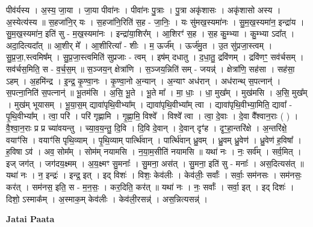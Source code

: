 \documentclass[17pt]{extarticle}
\begin{document}
पीव॑र्यस्य । अ॒स्य॒ जा॒या । जा॒या पीवा॑नः । पीवा॑नः पु॒त्राः । पु॒त्रा अकृ॑शासः । अकृ॑शासो अस्य । अ॒स्येत्य॑स्य ॥ स॒हजा॑नि॒र् यः । स॒हजा॑नि॒रिति॑ स॒ह - जा॒निः॒ । यः सु॑मख॒स्यमा॑नः । सु॒म॒ख॒स्यमा॑न॒ इन्द्रा॑य । सु॒म॒ख॒स्यमा॑न॒ इति॑ सु - म॒ख॒स्यमा॑नः । इन्द्रा॑या॒शिर᳚म् । आ॒शिरꣳ॑ स॒ह । स॒ह कु॒म्भ्या । कु॒म्भ्या ऽदा᳚त् । अदा॒दित्यदा᳚त् ॥ आ॒शीर् मे᳚ । आ॒शीरित्या᳚ - शीः । म॒ ऊर्ज᳚म् । ऊर्ज॑मु॒त । उ॒त सु॑प्रजा॒स्त्वम् । सु॒प्र॒जा॒,स्त्वमिष᳚म् । सु॒प्र॒जा॒स्त्वमिति॑ सुप्रजाः - त्वम् । इष॑म् दधातु । द॒धा॒तु॒ द्रवि॑णम् । द्रवि॑णꣳ॒॒ सव॑र्चसम् । सव॑र्चस॒मिति॒ स - व॒र्च॒स॒म् ॥ स॒ञ्जय॒न् क्षेत्रा॑णि । स॒ञ्जय॒न्निति॑ सम् - जयन्न्॑ । क्षेत्रा॑णि॒ सह॑सा । सह॑सा॒ ऽहम् । अ॒हमि॑न्द्र । इ॒न्द्र॒ कृ॒ण्वा॒नः । कृ॒ण्वा॒नो अ॒न्यान् । अ॒न्याꣳ अध॑रान् । अध॑रान्थ् स॒पत्नान्॑ । स॒पत्ना॒निति॑ स॒पत्नान्॑ ॥ भू॒तम॑सि । अ॒सि॒ भू॒ते । भू॒ते मा᳚ । मा॒ धाः॒ । धा॒ मुख᳚म् । मुख॑मसि । अ॒सि॒ मुख᳚म् । मुख॑म् भूयासम् । भू॒या॒स॒म् द्यावा॑पृथि॒वीभ्या᳚म् । द्यावा॑पृथि॒वीभ्या᳚म् त्वा । द्यावा॑पृथि॒वीभ्या॒मिति॒ द्यावा᳚ - पृ॒थि॒वीभ्या᳚म् । त्वा॒ परि॑ । परि॑ गृह्णामि । गृ॒ह्णा॒मि॒ विश्वे᳚ । विश्वे᳚ त्वा । त्वा॒ दे॒वाः । दे॒वा वै᳚श्वान॒राः ( ) । वै॒श्वा॒न॒राः प्र \newline
प्र च्या॑वयन्तु । च्या॒व॒य॒न्तु॒ दि॒वि । दि॒वि दे॒वान् । दे॒वान् दृꣳ॑ह । दृꣳ॒॒हा॒न्तरि॑क्षे । अ॒न्तरि॑क्षे॒ वयाꣳ॑सि । वयाꣳ॑सि पृथि॒व्याम् । पृ॒थि॒व्याम् पार्त्थि॑वान् । पार्त्थि॑वान् ध्रु॒वम् । ध्रु॒वम् ध्रु॒वेण॑ । ध्रु॒वेण॑ ह॒विषा᳚ । ह॒विषा ऽव॑ । अव॒ सोम᳚म् । सोम॑म् नयामसि । न॒या॒म॒सीति॑ नयामसि ॥ यथा॑ नः । नः॒ सर्व᳚म् । सर्व॒मित् । इज् जग॑त् । जग॑दय॒क्ष्मम् । अ॒य॒क्ष्मꣳ सु॒मनाः᳚ । सु॒मना॒ अस॑त् । सु॒मना॒ इति॑ सु - मनाः᳚ । अस॒दित्यस॑त् ॥ यथा॑ नः । न॒ इन्द्रः॑ । इन्द्र॒ इत् । इद् विशः॑ । विशः॒ केव॑लीः । केव॑लीः॒ सर्वाः᳚ । सर्वाः॒ सम॑नसः । सम॑नसः॒ कर॑त् । सम॑नस॒ इति॒ स - म॒न॒सः॒ । कर॒दिति॒ कर॑त् ॥ यथा॑ नः । नः॒ सर्वाः᳚ । सर्वा॒ इत् । इद् दिशः॑ । दिशो॒ ऽस्माक᳚म् । अ॒स्माक॒म् केव॑लीः । केव॑ली॒रसन्न्॑ । अस॒न्नित्यसन्न्॑ । \newline

\textbf{Jatai Paata} \newline
\end{document}
